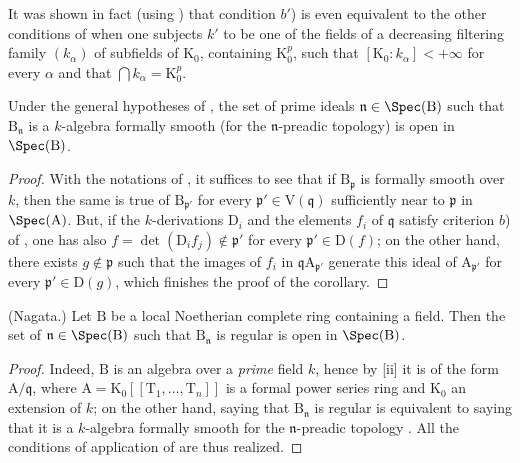 \begin{remark}[22.7.4]
\label{0.22.7.4}
It was shown in fact (using ) that condition $b'$) is even equivalent to the other conditions of  when one subjects $k'$ to be one of the fields of a decreasing filtering family $(k_\alpha)$ of subfields of $\mathrm{K}_0$, containing $\mathrm{K}_0^p$, such that $[\mathrm{K}_0:k_\alpha]<+\infty$ for every $\alpha$ and that $\bigcap k_\alpha=\mathrm{K}_0^p$.
\end{remark}

\begin{corollary}[22.7.5]
\label{0.22.7.5}
Under the general hypotheses of , the set of prime ideals $\mathfrak{n}\in\Spec(\mathrm{B})$ such that $\mathrm{B}_\mathfrak{n}$ is a $k$-algebra formally smooth (for the $\mathfrak{n}$-preadic topology) is open in $\Spec(\mathrm{B})$.
\end{corollary}

\begin{proof}
With the notations of , it suffices to see that if $\mathrm{B}_\mathfrak{p}$ is formally smooth over $k$, then the same is true of $\mathrm{B}_{\mathfrak{p}'}$ for every $\mathfrak{p}'\in\mathrm{V}(\mathfrak{q})$ sufficiently near to $\mathfrak{p}$ in $\Spec(\mathrm{A})$.
But, if the $k$-derivations $\mathrm{D}_i$ and the elements $f_i$ of $\mathfrak{q}$ satisfy criterion $b$) of , one has also $f=\det(\mathrm{D}_if_j)\notin\mathfrak{p}'$ for every $\mathfrak{p}'\in\mathrm{D}(f)$; on the other hand, there exists $g\notin\mathfrak{p}$ such that the images of $f_i$ in $\mathfrak{q}\mathrm{A}_{\mathfrak{p}'}$ generate this ideal of $\mathrm{A}_{\mathfrak{p}'}$ for every $\mathfrak{p}'\in\mathrm{D}(g)$, which finishes the proof of the corollary.
\end{proof}

\begin{corollary}[22.7.6]
\label{0.22.7.6}
\textnormal{(Nagata.)}
Let $\mathrm{B}$ be a local Noetherian complete ring containing a field.
Then the set of $\mathfrak{n}\in\Spec(\mathrm{B})$ such that $\mathrm{B}_\mathfrak{n}$ is regular is open in $\Spec(\mathrm{B})$.
\end{corollary}

\begin{proof}
Indeed, $\mathrm{B}$ is an algebra over a \emph{prime} field $k$, hence by [ii] it is of the form $\mathrm{A}/\mathfrak{q}$, where $\mathrm{A}=\mathrm{K}_0[[\mathrm{T}_1,\ldots,\mathrm{T}_n]]$ is a formal power series ring and $\mathrm{K}_0$ an extension of $k$; on the other hand, saying that $\mathrm{B}_\mathfrak{n}$ is regular is equivalent to saying that it is a $k$-algebra formally smooth for the $\mathfrak{n}$-preadic topology .
All the conditions of application of  are thus realized.
\end{proof}

